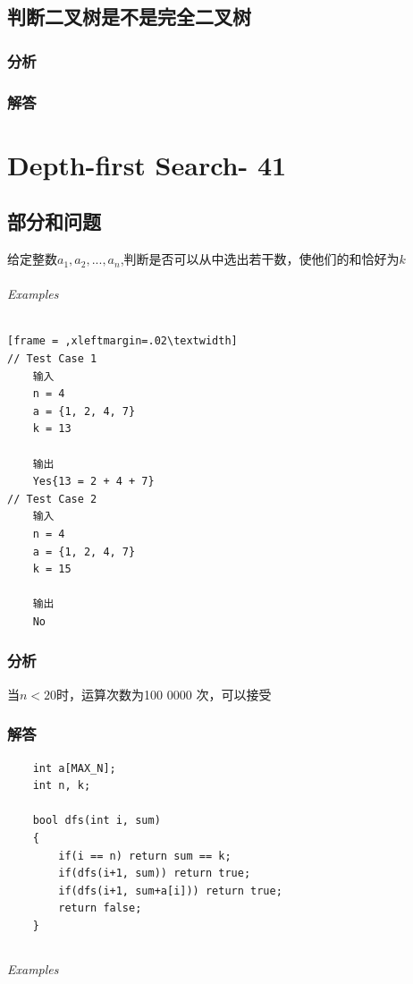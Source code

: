 \documentclass[UTF8,a4paper,12pt]{ctexbook}
\begin{document}
\section{判断二叉树是不是完全二叉树}
	\subsection{分析}
	
	\subsection{解答}
	
\chapter{Depth-first Search- 41}
\section{部分和问题}
	给定整数$a_1, a_2,...,a_n$,判断是否可以从中选出若干数，使他们的和恰好为$k$
	\subparagraph{Examples}
		\begin{lstlisting}[frame = ,xleftmargin=.02\textwidth]
// Test Case 1
	输入
	n = 4
	a = {1, 2, 4, 7}
	k = 13
	
	输出
	Yes{13 = 2 + 4 + 7}
// Test Case 2
	输入
	n = 4
	a = {1, 2, 4, 7}
	k = 15
	
	输出
	No
		\end{lstlisting}
	\subsection{分析}
	
	当$n < 20$时，运算次数为100 0000 次，可以接受
	\subsection{解答}
		\begin{lstlisting}
	int a[MAX_N];
	int n, k;
	
	bool dfs(int i, sum)
	{
		if(i == n) return sum == k;
		if(dfs(i+1, sum)) return true;
		if(dfs(i+1, sum+a[i])) return true;
		return false;
	}
		\end{lstlisting}
	
\section{}
	
	\subparagraph{Examples}
	
\end{document}

